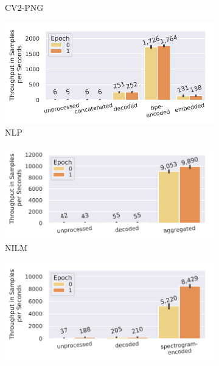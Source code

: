 {\begin{figure}[h]
\begin{subfigure}[c]{0.22\textwidth}
        \vspace{-18pt}
        \caption{CV2-PNG}
        \label{fig:caching-cv2-png}
    \end{subfigure}
    \begin{subfigure}[c]{0.22\textwidth}
        \includegraphics[width=\textwidth]{figures/openwebtext-pipeline/caching-over-epochs.pdf}
        \vspace{-18pt}
        \caption{NLP}
        \label{fig:caching-nlp}
    \end{subfigure}
    \begin{subfigure}[c]{0.22\textwidth}
        \includegraphics[width=\textwidth]{figures/cream-pipeline/caching-over-epochs.pdf}
        \vspace{-18pt}
        \caption{NILM}
        \label{fig:caching-nilm}
    \end{subfigure}
    \begin{subfigure}[c]{0.22\textwidth}
        \includegraphics[width=\textwidth]{figures/commonvoice-pipeline/caching-over-epochs.pdf}

\end{subfigure}
\end{figure}}
